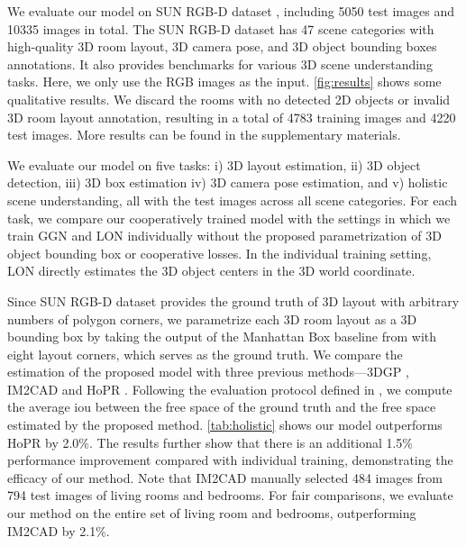 \documentclass{article}
\makeatletter
\renewcommand{\paragraph}{\@startsection{paragraph}{4}{\z@}{0ex \@plus 0ex \@minus 0ex}{-1em}{\hskip\parindent\normalfont\normalsize\bfseries}}
\makeatother
\begin{document}
We evaluate our model on SUN RGB-D dataset \citep{song2015sun}, including 5050 test images and 10335 images in total. The SUN RGB-D dataset has 47 scene categories with high-quality 3D room layout, 3D camera pose, and 3D object bounding boxes annotations. It also provides benchmarks for various 3D scene understanding tasks. Here, we only use the RGB images as the input. \autoref{fig:results} shows some qualitative results. We discard the rooms with no detected 2D objects or invalid 3D room layout annotation, resulting in a total of 4783 training images and 4220 test images. More results can be found in the supplementary materials.

We evaluate our model on five tasks: i) 3D layout estimation, ii) 3D object detection, iii) 3D box estimation iv) 3D camera pose estimation, and v) holistic scene understanding, all with the test images across all scene categories. For each task, we compare our cooperatively trained model with the settings in which we train GGN and LON individually without the proposed parametrization of 3D object bounding box or cooperative losses. In the individual training setting, LON directly estimates the 3D object centers in the 3D world coordinate.

\paragraph{3D Layout Estimation}

Since SUN RGB-D dataset provides the ground truth of 3D layout with arbitrary numbers of polygon corners, we parametrize each 3D room layout as a 3D bounding box by taking the output of the Manhattan Box baseline from \citep{song2015sun} with eight layout corners, which serves as the ground truth. We compare the estimation of the proposed model with three previous methods---3DGP \citep{choi2013understanding}, IM2CAD \citep{izadinia2016im2cad} and HoPR \citep{huang2018holistic}. Following the evaluation protocol defined in \citep{song2015sun}, we compute the average \ac{iou} between the free space of the ground truth and the free space estimated by the proposed method. \autoref{tab:holistic} shows our model outperforms HoPR by 2.0\%. The results further show that there is an additional 1.5\% performance improvement compared with individual training, demonstrating the efficacy of our method. Note that IM2CAD \citep{izadinia2016im2cad} manually selected 484 images from 794 test images of living rooms and bedrooms. For fair comparisons, we evaluate our method on the entire set of living room and bedrooms, outperforming IM2CAD by 2.1\%.
\end{document}
